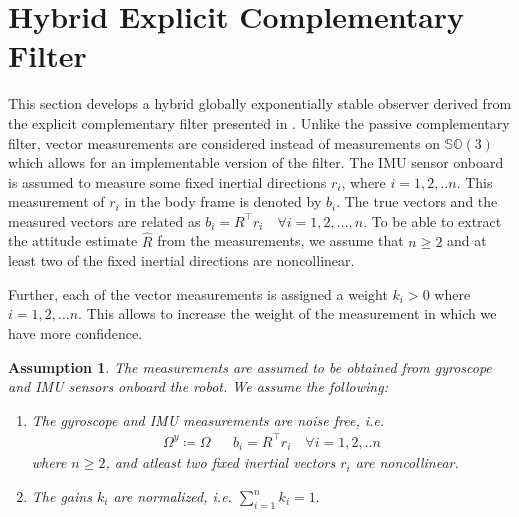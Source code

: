 \documentclass{article}
\newcommand{\SOthree}{\mathbb{SO}(3)}
\newcommand{\Omegay}{\Omega^y}
\newtheorem{assumption}{Assumption}
\begin{document}
\section{Hybrid Explicit Complementary Filter}

This section develops a hybrid globally exponentially stable observer derived from the explicit complementary filter presented in \cite{mahony_complementaryFilter}. Unlike the passive complementary filter, vector measurements are considered instead of measurements on $\SOthree$ which allows for an implementable version of the filter. 
The IMU sensor onboard is assumed to measure some fixed inertial directions $r_i$, where $i=1,2,..n$. This measurement of $r_i$ in the body frame is denoted by $b_i$. The true vectors and the measured vectors are related as $b_i = R^\top r_i \quad \forall i = 1,2,...,n$. To be able to extract the attitude estimate $\hat{R}$ from the measurements, we assume that $n\geq 2$ and at least two of the fixed inertial directions are noncollinear. 


Further, each of the vector measurements is assigned a weight $k_i > 0$ where $i=1,2,...n$. This allows to increase the weight of the measurement in which we have more confidence.  

\begin{assumption}\label{assumption:explicit}
The measurements are assumed to be obtained from gyroscope and IMU sensors onboard the robot. We assume the following:
\begin{enumerate}
    \item The gyroscope and IMU measurements are noise free, i.e.
    \begin{align}\label{eq:measmodel_explicit}
        \Omegay \coloneqq \Omega && b_i = R^\top r_i\quad \forall i = 1,2,..n
    \end{align}
    where $n\geq 2$, and atleast two fixed inertial vectors $r_i$ are noncollinear. 
    \item The gains $k_i$ are normalized, i.e. $\sum_{i=1}^n k_i = 1. $
\end{enumerate}
\end{assumption}
\end{document}
